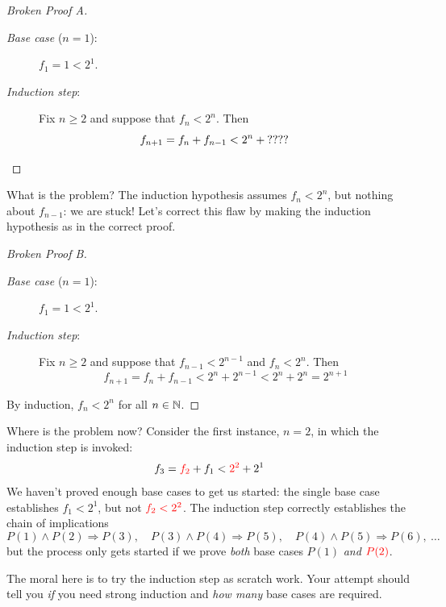 \begin{proof}[Broken Proof A]
	\begin{description}
		\item[\normalfont\emph{Base case} ($n=1$):] $f_1=1<2^1$.
		\item[\normalfont\emph{Induction step}:] Fix $n\ge 2$ and suppose that $f_n<2^n$. Then\footnotemark
		\[
			f_{n+1}=f_n+f_{n-1}<2^n+\text{????} \tag*{\phantom{\qedhere}}
		\]
	\end{description} 
\end{proof}



What is the problem? The induction hypothesis assumes $f_n<2^n$, but nothing about $f_{n-1}$: we are stuck! Let's correct this flaw by making the induction hypothesis as in the correct proof.

\begin{proof}[Broken Proof B]
	\begin{description}
		\item[\normalfont\emph{Base case} ($n=1$):] $f_1=1<2^1$.
		\item[\normalfont\emph{Induction step}:] Fix $n\ge 2$ and suppose that $f_{n-1}<2^{n-1}$ and $f_n<2^n$. Then
		\[
			f_{n+1}=f_n+f_{n-1}<2^n+2^{n-1}<2^n+2^n=2^{n+1}
		\]
	\end{description} 
	By induction, $f_n<2^n$ for all $n\in\mathbb{N}$.\phantom{\qedhere}
\end{proof}

Where is the problem now? Consider the first instance, $n=2$, in which the induction step is invoked:
\[
	f_3=\textcolor{red}{f_2}+f_1<\textcolor{red}{2^2}+2^1
\] 
We haven't proved enough base cases to get us started: the single base case establishes $f_1<2^1$, but not $\textcolor{red}{f_2<2^2}$. The induction step correctly establishes the chain of implications
\[
	P(1)\wedge P(2)\Longrightarrow P(3),\quad P(3)\wedge P(4)\Longrightarrow P(5),\quad P(4)\wedge P(5)\Longrightarrow P(6),\ \ldots
\]
but the process only gets started if we prove \emph{both} base cases $P(1)$ \emph{and} $\textcolor{red}{P(2)}$.\bigbreak

The moral here is to try the induction step as scratch work. Your attempt should tell you \emph{if} you need strong induction and \emph{how many} base cases are required.


